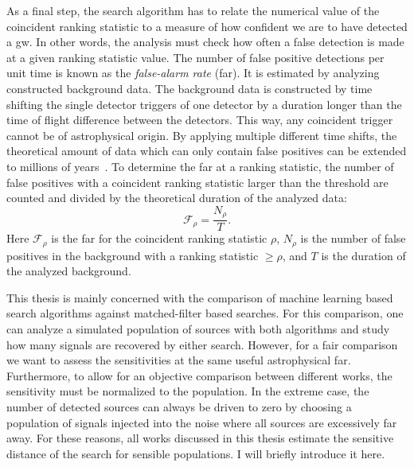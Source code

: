 As a final step, the search algorithm has to relate the numerical value of the coincident ranking statistic to a measure of how confident we are to have detected a \acrshort{gw}. In other words, the analysis must check how often a false detection is made at a given ranking statistic value. The number of false positive detections per unit time is known as the \emph{false-alarm rate} (\acrshort{far}). It is estimated by analyzing constructed background data. The background data is constructed by time shifting the single detector triggers of one detector by a duration longer than the time of flight difference between the detectors. This way, any coincident trigger cannot be of astrophysical origin. By applying multiple different time shifts, the theoretical amount of data which can only contain false positives can be extended to millions of years~\cite{Usman:2015kfa}. To determine the \acrshort{far} at a ranking statistic, the number of false positives with a coincident ranking statistic larger than the threshold are counted and divided by the theoretical duration of the analyzed data:
\begin{equation}
\mathcal{F}_\rho = \frac{N_\rho}{T}.
\end{equation}
Here $\mathcal{F}_\rho$ is the \acrshort{far} for the coincident ranking statistic $\rho$, $N_\rho$ is the number of false positives in the background with a ranking statistic $\geq\rho$, and $T$ is the duration of the analyzed background.

This thesis is mainly concerned with the comparison of machine learning based search algorithms against matched-filter based searches. For this comparison, one can analyze a simulated population of sources with both algorithms and study how many signals are recovered by either search. However, for a fair comparison we want to assess the sensitivities at the same useful astrophysical \acrshort{far}. Furthermore, to allow for an objective comparison between different works, the sensitivity must be normalized to the population. In the extreme case, the number of detected sources can always be driven to zero by choosing a population of signals injected into the noise where all sources are excessively far away. For these reasons, all works discussed in this thesis estimate the sensitive distance of the search for sensible populations. I will briefly introduce it here.

